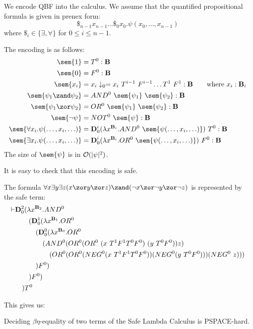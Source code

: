 We encode QBF into the calculus.
We assume that the quantified propositional formula is given in prenex form:
$$\$_{n-1} x_{n-1} \ldots \$_0 x_0 . \psi(x_0, \ldots, x_{n-1})$$
where $\$_i \in \{\exists,\forall\}$ for $0\leq i\leq n-1$.

The encoding is as follows:
\begin{align*}
\sem{1} &= T^0  : \booltype \\
\sem{0} &= F^0 : \booltype \\
\sem{x_i} &= x_i\downarrow_0 = x_i~T^{i-1}~F^{i-1}\ldots T^1~F^1: \booltype \qquad \hbox{where $x_i:\booltype_i$}\\
\sem{\psi_1\zand \psi_2} &= AND^0~\sem{\psi_1}~\sem{\psi_2}
:\booltype  \\
\sem{\psi_1\zor \psi_2} &= OR^0~\sem{\psi_1}~\sem{\psi_2}
:\booltype  \\
\sem{\neg \psi} &= NOT^0~\sem{\psi}
:\booltype  \\
\sem{\forall x_i.\psi(\ldots, x_i, \ldots)} & = \mathbf{D}_0^i(\lambda x^{\booltype_i}. AND^0~\sem{\psi(\ldots, x_i, \ldots)})~T^0 :\booltype\\
\sem{\exists x_i.\psi(\ldots, x_i, \ldots)} & = \mathbf{D}_0^i(\lambda x^{\booltype_i}.OR^0~\sem{\psi(\ldots, x_i, \ldots)})~F^0 :\booltype
\end{align*}
The size of $\sem{\psi}$ is in $\mathcal{O}(|\psi|^2)$.

It is easy to check that this encoding is safe.
\begin{example}
  The formula $\forall x \exists y \exists z (x\zor y\zor z)\zand(\neg x\zor \neg y\zor \neg z)$ is represented by the safe term:
\begin{align*}
\vdash &\mathbf{D}_0^2(\lambda x^{\mathbf{B}_2}. AND^0\\
&\quad\quad (\mathbf{D}_0^1(\lambda x^{\mathbf{B}_1}.OR^0\\
&\quad\quad\quad (\mathbf{D}_0^0(\lambda x^{\mathbf{B}_0}.OR^0\\
&\quad\quad\quad\quad (AND^0 (OR^0(OR^0~(x~T^1 F^1 T^0 F^0)~(y~T^0 F^0))z) \\
&\quad\quad\quad\quad\quad (OR^0(OR^0(NEG^0 (x~T^1 F^1 T^0 F^0))(NEG^0 (y~T^0 F^0)))(NEG^0~z))) \\
&\quad\quad\quad )F^0)\\
&\quad\quad)F^0)\\
&\quad) T^0
\end{align*}
\end{example}
This gives us:
\begin{theorem}
  Deciding $\beta\eta$-equality of two terms of the Safe Lambda Calculus is PSPACE-hard.
\end{theorem}


